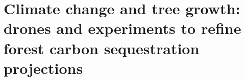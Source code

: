 \documentclass[12pt]{article}
\begin{document}
\pagestyle{fancy}
\fancyhf{} %
\fancyfoot[C]{\thepage}
\renewcommand{\headrulewidth}{0pt}


\section*{Climate change and tree growth: drones and experiments to refine forest carbon sequestration projections}
\end{document}
